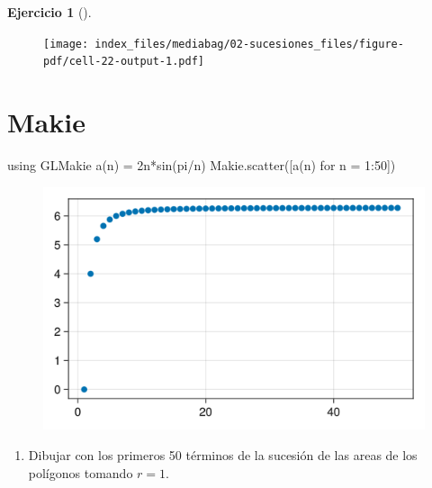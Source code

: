 \documentclass[
  a4paper,
]{scrreport}
\newenvironment{Shaded}{\begin{snugshade}}{\end{snugshade}}
\newcommand{\BuiltInTok}[1]{\textcolor[rgb]{0.00,0.23,0.31}{#1}}
\newcommand{\ConstantTok}[1]{\textcolor[rgb]{0.56,0.35,0.01}{#1}}
\newcommand{\FloatTok}[1]{\textcolor[rgb]{0.68,0.00,0.00}{#1}}
\newcommand{\FunctionTok}[1]{\textcolor[rgb]{0.28,0.35,0.67}{#1}}
\newcommand{\ImportTok}[1]{\textcolor[rgb]{0.00,0.46,0.62}{#1}}
\newcommand{\NormalTok}[1]{\textcolor[rgb]{0.00,0.23,0.31}{#1}}
\newcommand{\OperatorTok}[1]{\textcolor[rgb]{0.37,0.37,0.37}{#1}}
\providecommand{\tightlist}{%
  \setlength{\itemsep}{0pt}\setlength{\parskip}{0pt}}\usepackage{longtable,booktabs,array}
\theoremstyle{definition}
\newtheorem{exercise}{Ejercicio}[chapter]
\theoremstyle{remark}
\begin{document}
\begin{exercise}[]
\begin{tcolorbox}
\begin{figure}[H]

{\centering \texttt{[image: index\_files/mediabag/02-sucesiones\_files/figure-pdf/cell-22-output-1.pdf]}

}

\end{figure}

\section{Makie}

\begin{Shaded}
\begin{Highlighting}[]
\ImportTok{using} \BuiltInTok{GLMakie}
\FunctionTok{a}\NormalTok{(n) }\OperatorTok{=} \FloatTok{2}\FunctionTok{n*sin}\NormalTok{(}\ConstantTok{pi}\OperatorTok{/}\NormalTok{n)}
\NormalTok{Makie.}\FunctionTok{scatter}\NormalTok{([}\FunctionTok{a}\NormalTok{(n) for n }\OperatorTok{=} \FloatTok{1}\OperatorTok{:}\FloatTok{50}\NormalTok{])}
\end{Highlighting}
\end{Shaded}

\begin{figure}[H]

{\centering \includegraphics{02-sucesiones_files/figure-pdf/cell-23-output-1.png}

}

\end{figure}

\end{tcolorbox}

\begin{enumerate}
\def\labelenumi{\alph{enumi}.}
\setcounter{enumi}{1}
\tightlist
\item
  Dibujar con los primeros 50 términos de la sucesión de las areas de
  los polígonos tomando \(r=1\).
\end{enumerate}


\end{exercise}
\end{document}
